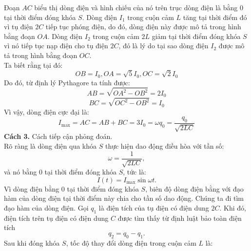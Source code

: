 \begin{loigiai}
\begin{center}
    \end{center}
    Đoạn $AC$ biểu thị dòng điện và hình chiếu của nó trên trục dòng điện là bằng $0$ tại thời điểm đóng khóa $S$. Dòng điện $I_{1}$ trong cuộn cảm $L$ tăng tại thời điểm đó vì tụ điện $2 C$ tiếp tục phóng điện, do đó, dòng điện này được mô tả trong hình bằng đoạn $O A$. Dòng điện $I_{2}$ trong cuộn cảm $2 L$ giảm tại thời điểm đóng khóa $S$ vì nó tiếp tục nạp điện cho tụ điện $2 C$, đó là lý do tại sao dòng điện $I_{2}$ được mô tả trong hình bằng đoạn $O C$.\\
    Ta biết rằng tại đó:
    \[OB = I_{0}, O A=\sqrt{5} I_{0}, OC = \sqrt{2} I_{0}\]
    Do đó, từ định lý Pythagore ta tính được:
    \[A B=\sqrt{O A^{2}-O B^{2}}=2 I_{0} \tag{2.1} \label{q.11.2.1}\]
    \[B C=\sqrt{O C^{2}-O B^{2}}=I_{0}\tag{2.2} \label{q.11.2.2}\]
    Vì vậy, dòng điện cực đại là:
    \[I_{\max} = AC =AB + BC = 3 I_{0} = \omega q_{0}=\dfrac{q_{0}}{\sqrt{2 L C}} \tag{2.3} \label{q.11.2.3}\]
    \textbf{Cách 3.} Cách tiếp cận phỏng đoán.\\
    Rõ ràng là dòng điện qua khóa $S$ thực hiện dao động điều hòa với tần số:
    \[\omega=\dfrac{1}{\sqrt{2 L C}}, \tag{3.1} \label{q.11.3.1}\]
    và nó bằng $0$ tại thời điểm đóng khóa $S$, tức là:
    \[I(t)=I_{\max} \sin \omega t. \tag{3.2} \label{q.11.3.2}\]
    Vì dòng điện bằng $0$ tại thời điểm đóng khóa $S$, biên độ dòng điện bằng với đạo hàm của dòng điện tại thời điểm này chia cho tần số dao động. Chúng ta đi tìm đạo hàm của dòng điện. Gọi $q_{1}$ là điện tích của tụ điện có điện dung $2 C$. Khi đó, điện tích trên tụ điện có điện dung $C$ được tìm thấy từ định luật bảo toàn điện tích
    \[q_{2}=q_{0}-q_{1}.\tag{3.3} \label{q.11.3.3} \]
    Sau khi đóng khóa $S$, tốc độ thay đổi dòng điện trong cuộn cảm $L$ là:

\end{loigiai}

